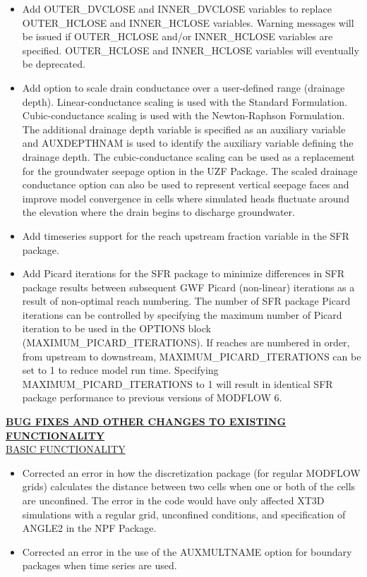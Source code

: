 \documentclass[11pt,twoside,twocolumn]{usgsreport}
\begin{document}
\begin{itemize}
\begin{itemize}
		\item Add OUTER\_DVCLOSE and INNER\_DVCLOSE variables to replace OUTER\_HCLOSE and INNER\_HCLOSE variables. Warning messages will be issued if OUTER\_HCLOSE and/or INNER\_HCLOSE variables are specified. OUTER\_HCLOSE and INNER\_HCLOSE variables will eventually be deprecated. 
		\item Add option to scale drain conductance over a user-defined range (drainage depth). Linear-conductance scaling is used with the Standard Formulation. Cubic-conductance scaling is used with the Newton-Raphson Formulation. The additional drainage depth variable is specified as an auxiliary variable and AUXDEPTHNAM is used to identify the auxiliary variable defining the drainage depth. The cubic-conductance scaling can be used as a replacement for the groundwater seepage option in the UZF Package. The scaled drainage conductance option can also be used to represent vertical seepage faces and improve model convergence in cells where simulated heads fluctuate around the elevation where the drain begins to discharge groundwater.
		\item Add timeseries support for the reach upstream fraction variable in the SFR package.
		\item Add Picard iterations for the SFR package to minimize differences in SFR package results between subsequent GWF Picard (non-linear) iterations as a result of non-optimal reach numbering. The number of SFR package Picard iterations can be controlled by specifying the maximum number of Picard  iteration to be used in the OPTIONS block (MAXIMUM\_PICARD\_ITERATIONS). If reaches are numbered in order, from upstream to downstream, MAXIMUM\_PICARD\_ITERATIONS can be set to 1 to reduce model run time. Specifying  MAXIMUM\_PICARD\_ITERATIONS to 1 will result in identical SFR package performance to previous versions of MODFLOW 6.
	\end{itemize}

	\textbf{\underline{BUG FIXES AND OTHER CHANGES TO EXISTING FUNCTIONALITY}} \\
	\underline{BASIC FUNCTIONALITY}
	\begin{itemize}
		\item Corrected an error in how the discretization package (for regular MODFLOW grids) calculates the distance between two cells when one or both of the cells are unconfined.  The error in the code would have only affected XT3D simulations with a regular grid, unconfined conditions, and specification of ANGLE2 in the NPF Package.  
		\item Corrected an error in the use of the AUXMULTNAME option for boundary packages when time series are used.
	\end{itemize}


\end{itemize}
\end{document}
